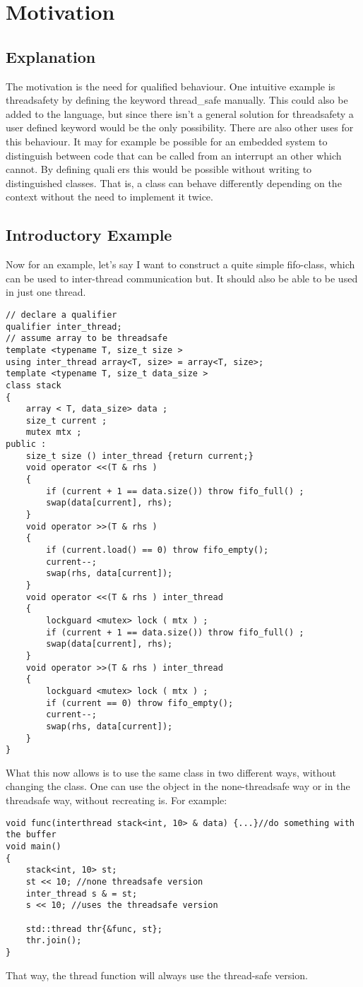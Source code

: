 \section{Motivation}
\subsection{Explanation}
The motivation is the need for qualified behaviour. One intuitive example is threadsafety by defining the keyword thread\_safe manually. This could also be added to the language, but since there isn't a general solution for threadsafety a user defined keyword would be the only possibility. There are also other uses for this behaviour. It may for example be possible for an embedded system to distinguish between code that can be called from an interrupt an other
which cannot. By defining qualiers this would be possible without writing to distinguished classes. That is, a class can behave differently depending on the context without the need to implement it twice.
\subsection{Introductory Example}
Now for an example, let's say I want to construct a quite simple fifo-class, which can be used
to inter-thread communication but. It should also be able to be used in just one thread.
\begin{lstlisting}
// declare a qualifier
qualifier inter_thread;
// assume array to be threadsafe
template <typename T, size_t size >
using inter_thread array<T, size> = array<T, size>;
template <typename T, size_t data_size >
class stack
{
	array < T, data_size> data ;
	size_t current ;
	mutex mtx ;
public :
	size_t size () inter_thread {return current;}
	void operator <<(T & rhs )
	{
		if (current + 1 == data.size()) throw fifo_full() ;
		swap(data[current], rhs);
	}
	void operator >>(T & rhs )
	{
		if (current.load() == 0) throw fifo_empty();
		current--;
		swap(rhs, data[current]);
	}
	void operator <<(T & rhs ) inter_thread
	{
		lockguard <mutex> lock ( mtx ) ;
		if (current + 1 == data.size()) throw fifo_full() ;
		swap(data[current], rhs);
	}
	void operator >>(T & rhs ) inter_thread
	{
		lockguard <mutex> lock ( mtx ) ;
		if (current == 0) throw fifo_empty();
		current--;
		swap(rhs, data[current]);
	}
}
\end{lstlisting}
What this now allows is to use the same class in two different ways, without changing the class. One can use the object in the none-threadsafe way or in the threadsafe way, without recreating is. For example:
\begin{lstlisting}[firstnumber=39]
void func(interthread stack<int, 10> & data) {...}//do something with the buffer
void main()
{
	stack<int, 10> st;
	st << 10; //none threadsafe version
	inter_thread s & = st;
	s << 10; //uses the threadsafe version
	
	std::thread thr{&func, st}; 
	thr.join();
}
\end{lstlisting}
That way, the thread function will always use the thread-safe version.
